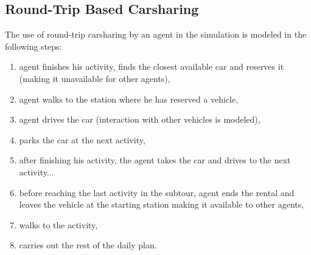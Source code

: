 \subsection{Round-Trip Based Carsharing}
The use of round-trip carsharing by an agent in the simulation is modeled in the following steps: 
\begin{enumerate}
	\item agent finishes his activity, finds the closest available car and reserves it (making it unavailable for other agents),
	\item agent walks to the station where he has reserved a vehicle,
	\item agent drives the car (interaction with other vehicles is modeled),
	\item parks the car at the next activity,
	\item after finishing his activity, the agent takes the car and drives to the next activity...
	\item before reaching the last activity in the subtour, agent ends the rental and leaves the vehicle at the starting station making it available to other agents,
	\item walks to the activity,
	\item carries out the rest of the daily plan.
\end{enumerate}

